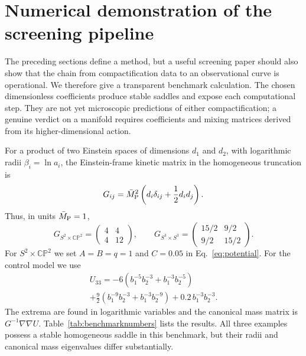 \documentclass[aps,prd,twocolumn,superscriptaddress,nofootinbib,longbibliography]{revtex4-2}
\newcommand{\Mpl}{\bar M_{\rm P}}
\newcommand{\CP}{\mathbb{CP}}
\begin{document}
\section{Numerical demonstration of the screening pipeline}
\label{sec:numericaldemo}
The preceding sections define a method, but a useful screening paper should also show that the chain from compactification data to an observational curve is operational. We therefore give a transparent benchmark calculation. The chosen dimensionless coefficients produce stable saddles and expose each computational step. They are not yet microscopic predictions of either compactification; a genuine verdict on a manifold requires coefficients and mixing matrices derived from its higher-dimensional action.

For a product of two Einstein spaces of dimensions $d_1$ and $d_2$, with logarithmic radii $\beta_i=\ln a_i$, the Einstein-frame kinetic matrix in the homogeneous truncation is
\begin{equation}
G_{ij}=\Mpl^2\left(d_i\delta_{ij}+\frac12 d_i d_j\right).
\label{eq:kineticmatrixbenchmark}
\end{equation}
Thus, in units $\Mpl=1$,
\begin{equation}
G_{S^2\times\CP^2}=\begin{pmatrix}4&4\\4&12\end{pmatrix},\qquad
G_{S^3\times S^3}=\begin{pmatrix}15/2&9/2\\9/2&15/2\end{pmatrix}.
\end{equation}
For $S^2\times\CP^2$ we set $A=B=q=1$ and $C=0.05$ in Eq.~\eqref{eq:potential}. For the control model we use
\begin{multline}
U_{33}=-6\left(b_1^{-5}b_2^{-3}+b_1^{-3}b_2^{-5}\right)\\
+\frac92\left(b_1^{-9}b_2^{-3}+b_1^{-3}b_2^{-9}\right)
+0.2\,b_1^{-3}b_2^{-3}.
\label{eq:s3benchmarkpotential}
\end{multline}
The extrema are found in logarithmic variables and the canonical mass matrix is $G^{-1}\nabla\nabla U$. Table~\ref{tab:benchmarknumbers} lists the results. All three examples possess a stable homogeneous saddle in this benchmark, but their radii and canonical mass eigenvalues differ substantially.
\end{document}
